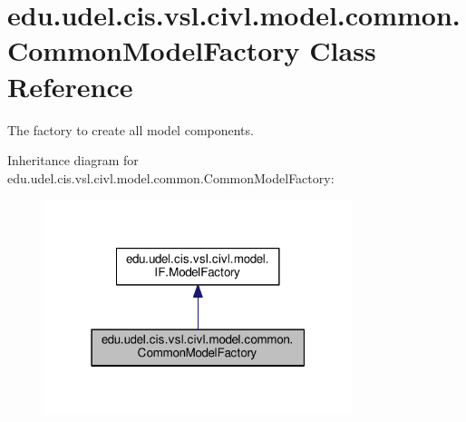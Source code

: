 \hypertarget{classedu_1_1udel_1_1cis_1_1vsl_1_1civl_1_1model_1_1common_1_1CommonModelFactory}{}\section{edu.\+udel.\+cis.\+vsl.\+civl.\+model.\+common.\+Common\+Model\+Factory Class Reference}
\label{classedu_1_1udel_1_1cis_1_1vsl_1_1civl_1_1model_1_1common_1_1CommonModelFactory}


The factory to create all model components.  




Inheritance diagram for edu.\+udel.\+cis.\+vsl.\+civl.\+model.\+common.\+Common\+Model\+Factory\+:
\nopagebreak
\begin{figure}[H]
\begin{center}
\leavevmode
\includegraphics[width=256pt]{classedu_1_1udel_1_1cis_1_1vsl_1_1civl_1_1model_1_1common_1_1CommonModelFactory__inherit__graph}
\end{center}
\end{figure}


